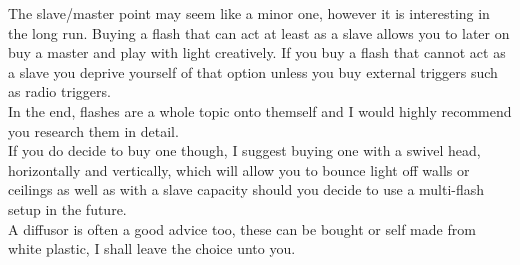 The slave/master point may seem like a minor one, however it is interesting in the long run. Buying a flash that can act at least as a slave allows you to later on buy a master and play with light creatively. If you buy a flash that cannot act as a slave you deprive yourself of that option unless you buy external triggers such as radio triggers.
\\[\baselineskip]
In the end, flashes are a whole topic onto themself and I would highly recommend you research them in detail.
\\
If you do decide to buy one though, I suggest buying one with a swivel head, horizontally and vertically, which will allow you to bounce light off walls or ceilings as well as with a slave capacity should you decide to use a multi-flash setup in the future.
\\[\baselineskip]
A diffusor is often a good advice too, these can be bought or self made from white plastic, I shall leave the choice unto you.